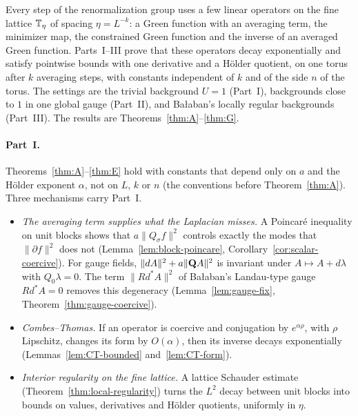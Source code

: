 
\label{g:linear}

Every step of the renormalization group uses a few linear operators on the fine lattice $\mathbb T_\eta$ of spacing $\eta=L^{-k}$: a Green function with an averaging term, the minimizer map, the constrained Green function and the inverse of an averaged Green function. Parts~I--III prove that these operators decay exponentially and satisfy pointwise bounds with one derivative and a H\"older quotient, on one torus after $k$ averaging steps, with constants independent of $k$ and of the side $n$ of the torus. The settings are the trivial background $U=1$ (Part~I), backgrounds close to $1$ in one global gauge (Part~II), and Ba\l aban's locally regular backgrounds (Part~III). The results are Theorems~\ref{thm:A}--\ref{thm:G}.

\paragraph{Part~I.} Theorems~\ref{thm:A}--\ref{thm:E} hold with constants that depend only on $a$ and the H\"older exponent $\alpha$, not on $L$, $k$ or $n$ (the conventions before Theorem~\ref{thm:A}). Three mechanisms carry Part~I.
\begin{itemize}
\item \emph{The averaging term supplies what the Laplacian misses.} A Poincar\'e inequality on unit blocks shows that $a\|Q_\sigma f\|^2$ controls exactly the modes that $\|\partial f\|^2$ does not (Lemma~\ref{lem:block-poincare}, Corollary~\ref{cor:scalar-coercive}). For gauge fields, $\|dA\|^2+a\|\mathbf Q A\|^2$ is invariant under $A\mapsto A+d\lambda$ with $Q_0\lambda=0$. The term $\|Rd^*A\|^2$ of Ba\l aban's Landau-type gauge $Rd^*A=0$ removes this degeneracy (Lemma~\ref{lem:gauge-fix}, Theorem~\ref{thm:gauge-coercive}).
\item \emph{Combes--Thomas.} If an operator is coercive and conjugation by $e^{\alpha\rho}$, with $\rho$ Lipschitz, changes its form by $O(\alpha)$, then its inverse decays exponentially (Lemmas~\ref{lem:CT-bounded} and~\ref{lem:CT-form}).
\item \emph{Interior regularity on the fine lattice.} A lattice Schauder estimate (Theorem~\ref{thm:local-regularity}) turns the $L^2$ decay between unit blocks into bounds on values, derivatives and H\"older quotients, uniformly in $\eta$.
\end{itemize}

